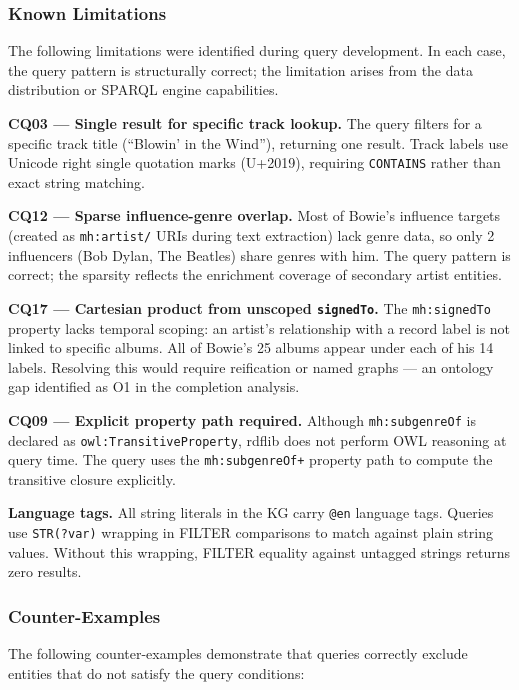 \documentclass[11pt,a4paper]{article}
\begin{document}
\subsubsection{Known Limitations}

The following limitations were identified during query development. In each case, the query pattern is structurally correct; the limitation arises from the data distribution or SPARQL engine capabilities.

\textbf{CQ03 --- Single result for specific track lookup.} The query filters for a specific track title (``Blowin' in the Wind''), returning one result. Track labels use Unicode right single quotation marks (U+2019), requiring \texttt{CONTAINS} rather than exact string matching.

\textbf{CQ12 --- Sparse influence-genre overlap.} Most of Bowie's influence targets (created as \texttt{mh:artist/} URIs during text extraction) lack genre data, so only 2 influencers (Bob Dylan, The Beatles) share genres with him. The query pattern is correct; the sparsity reflects the enrichment coverage of secondary artist entities.

\textbf{CQ17 --- Cartesian product from unscoped \texttt{signedTo}.} The \texttt{mh:signedTo} property lacks temporal scoping: an artist's relationship with a record label is not linked to specific albums. All of Bowie's 25 albums appear under each of his 14 labels. Resolving this would require reification or named graphs --- an ontology gap identified as O1 in the completion analysis.

\textbf{CQ09 --- Explicit property path required.} Although \texttt{mh:subgenreOf} is declared as \texttt{owl:TransitiveProperty}, rdflib does not perform OWL reasoning at query time. The query uses the \texttt{mh:subgenreOf+} property path to compute the transitive closure explicitly.

\textbf{Language tags.} All string literals in the KG carry \texttt{@en} language tags. Queries use \texttt{STR(?var)} wrapping in FILTER comparisons to match against plain string values. Without this wrapping, FILTER equality against untagged strings returns zero results.

\subsubsection{Counter-Examples}

The following counter-examples demonstrate that queries correctly exclude entities that do not satisfy the query conditions:
\end{document}
